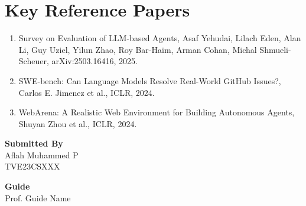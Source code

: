 \documentclass[12pt]{article}
\newcommand{\studentname}{Aflah Muhammed P}
\newcommand{\rollno}{TVE23CSXXX}
\newcommand{\guidename}{Prof. Guide Name}
\begin{document}
\section*{Key Reference Papers}
\begin{enumerate}
  \item Survey on Evaluation of LLM-based Agents, Asaf Yehudai, Lilach Eden, Alan Li, Guy Uziel, Yilun Zhao, Roy Bar-Haim, Arman Cohan, Michal Shmueli-Scheuer, arXiv:2503.16416, 2025.
  \item SWE-bench: Can Language Models Resolve Real-World GitHub Issues?, Carlos E. Jimenez et al., ICLR, 2024.
  \item WebArena: A Realistic Web Environment for Building Autonomous Agents, Shuyan Zhou et al., ICLR, 2024.
\end{enumerate}
\vspace{1.5em}

\noindent\textbf{Submitted By}\\
\studentname\\
\rollno

\vspace{1em}
\noindent\textbf{Guide}\\
\guidename
\end{document}
